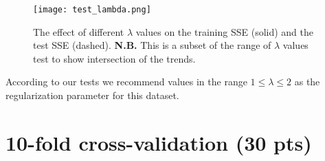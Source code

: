 \documentclass{article}
\begin{document}
\begin{figure}[t]
\centering
\texttt{[image: test\_lambda.png]}
\caption{The effect of different $\lambda$ values on the training SSE (solid) and the test SSE (dashed). \textbf{N.B.} This is a subset of the range of $\lambda$ values test to show intersection of the trends.}
\end{figure}

According to our tests we recommend values in the range $1 \le \lambda \le 2$ as the regularization parameter for this dataset.

\section{10-fold cross-validation (30 pts)}
\end{document}
